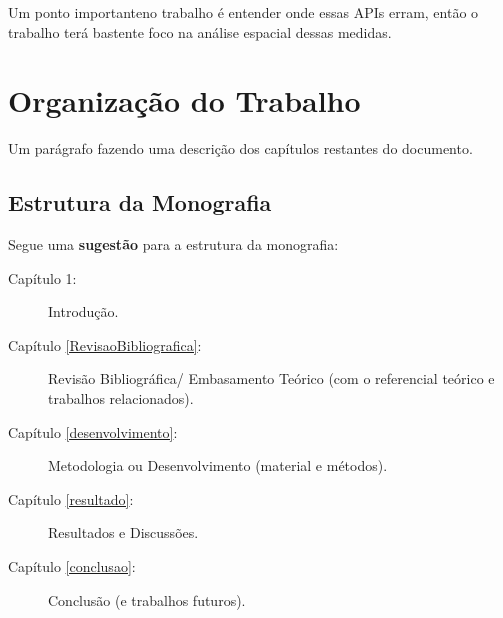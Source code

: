 Um ponto importanteno trabalho é entender onde essas APIs erram, então o trabalho terá bastente foco na análise espacial dessas medidas. 


\section{Organização do Trabalho}

Um parágrafo fazendo uma descrição dos capítulos restantes do documento. 

\subsection{Estrutura da Monografia}

Segue uma \textbf{sugestão} para a estrutura da monografia: 

\begin{description}
   \item[Capítulo 1:] Introdução.
   \item[Capítulo \ref{RevisaoBibliografica}:] Revisão Bibliográfica/ Embasamento Teórico (com o referencial teórico e trabalhos relacionados).
   \item[Capítulo \ref{desenvolvimento}:] Metodologia ou Desenvolvimento (material e métodos).
   \item[Capítulo \ref{resultado}:] Resultados e Discussões.
   \item[Capítulo \ref{conclusao}:] Conclusão (e trabalhos futuros).
\end{description}


 









